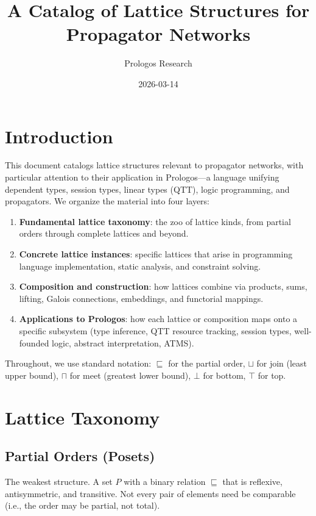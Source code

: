 \documentclass[11pt]{article}
\author{Prologos Research}
\date{2026-03-14}
\title{A Catalog of Lattice Structures for Propagator Networks}
\begin{document}
\maketitle
\setcounter{tocdepth}{3}
\tableofcontents

\section{Introduction}
\label{sec:org1d1381f}

This document catalogs lattice structures relevant to propagator networks, with
particular attention to their application in Prologos---a language unifying
dependent types, session types, linear types (QTT), logic programming, and
propagators. We organize the material into four layers:

\begin{enumerate}
\item \textbf{Fundamental lattice taxonomy}: the zoo of lattice kinds, from partial orders
through complete lattices and beyond.
\item \textbf{Concrete lattice instances}: specific lattices that arise in programming
language implementation, static analysis, and constraint solving.
\item \textbf{Composition and construction}: how lattices combine via products, sums,
lifting, Galois connections, embeddings, and functorial mappings.
\item \textbf{Applications to Prologos}: how each lattice or composition maps onto a
specific subsystem (type inference, QTT resource tracking, session types,
well-founded logic, abstract interpretation, ATMS).
\end{enumerate}

Throughout, we use standard notation: \(\sqsubseteq\) for the partial order,
\(\sqcup\) for join (least upper bound), \(\sqcap\) for meet (greatest lower bound),
\(\bot\) for bottom, \(\top\) for top.
\section{Lattice Taxonomy}
\label{sec:org43b003e}

\subsection{Partial Orders (Posets)}
\label{sec:orgd711d91}

The weakest structure. A set \(P\) with a binary relation \(\sqsubseteq\) that is
reflexive, antisymmetric, and transitive. Not every pair of elements need be
comparable (i.e., the order may be partial, not total).
\end{document}
